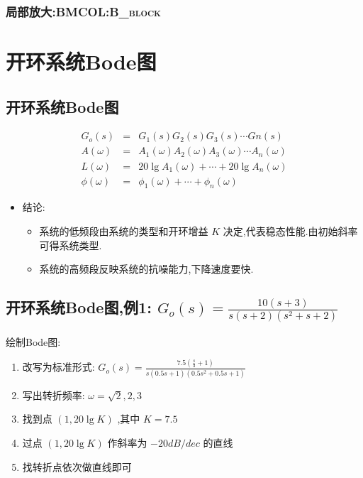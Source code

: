 \documentclass[table]{article}
\begin{document}
\subsubsection[局部放大:]{局部放大:\hfill{}\textsc{BMCOL:B\_block}}
\label{sec:orgfefe933}

\section{开环系统Bode图}
\label{sec:orgf6b7006}
\subsection{开环系统Bode图}
\label{sec:orgbd4ae1e}
\begin{eqnarray*}
G_o(s) &=  &G_1(s)G_2(s)G_3(s)\cdots Gn(s) \\
A(\omega) &=&A_1(\omega)A_2(\omega)A_3(\omega)\cdots A_n(\omega)\\
L(\omega) &=&20\lg A_1(\omega)+\cdots+20\lg A_n(\omega) \\
\phi(\omega) &=& \phi_1(\omega)+\cdots+\phi_n(\omega)
\end{eqnarray*}

\begin{itemize}
\item <2->结论:
\begin{itemize}
\item <2->系统的低频段由系统的类型和开环增益  \(K\)  决定,代表稳态性能.由初始斜率可得系统类型.
\item <3->系统的高频段反映系统的抗噪能力,下降速度要快.
\end{itemize}
\end{itemize}

\subsection{开环系统Bode图,例1: \(G_o(s)=\frac{10(s+3)}{s(s+2)(s^2+s+2)}\)}
\label{sec:orgb6d2cbe}
绘制Bode图:
\begin{enumerate}
\item <2->改写为标准形式:  \(G_o(s)=\frac{7.5(\frac{s}{3}+1)}{s(0.5s+1)(0.5s^2+0.5s+1)}\)
\item <3->写出转折频率:  \(\omega=\sqrt{2},2,3\)
\item <4->找到点  \((1,20\lg K)\)  ,其中 \(K=7.5\)
\item <5->过点  \((1,20\lg K)\)  作斜率为  \(-20dB/dec\)  的直线
\item <6->找转折点依次做直线即可
\end{enumerate}
\end{document}
